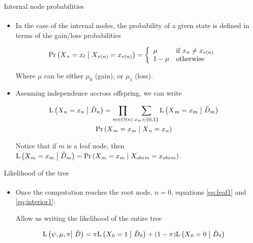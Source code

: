 \documentclass[9pt,ignorenonframetext,]{beamer}
\newcommand{\Prcond}[2]{{\mbox{Pr}\left(#1\vphantom{#2}\;\right|\left.\vphantom{#1}#2\right)}}
\newcommand{\Likecond}[2]{{\mbox{L}\left(#1\vphantom{#2}\;\right|\left.\vphantom{#1}#2\right)}}
\newcommand{\likelihood}[2]{\mbox{L}\left(#1\vphantom{#2}\right|\left.\vphantom{#1}#2\right)}
\newcommand{\aphylo}{D{}}      %
\newcommand{\aphyloObs}{\tilde \aphylo{}} %
\newcommand{\Ann}{X{}} %
\newcommand{\ann}{x{}} %
\newcommand{\AnnObs}{{X_{obs}}{}}%
\newcommand{\annObs}{{x_{obs}}{}}%
\begin{document}
\begin{frame}[t,label=internalnodeprob]{Internal node probabilities}

\framesubtitle{\hyperlink{peelingalgorithm}{}}

\begin{itemize}
\item
  In the case of the internal nodes, the probability of a given state is
  defined in terms of the gain/loss probabilities

  \[
  \Prcond{\Ann_{n} = \ann_{l}}{\Ann_{r(n)} = \ann_{r(n)}} = \left\{
  \begin{array}{ll}
  \mu & \mbox{if }\ann_{n} \neq \ann_{r(n)} \\
  1 - \mu & \mbox{otherwise}
  \end{array}
  \right.
  \]

  Where \(\mu\) can be either \(\mu_0\) (gain), or \(\mu_1\) (loss).
\item
  Assuming independence accross offspring, we can write

  \begin{multline}
  \label{eq:interior1}
  \Likecond{\Ann_n = \ann_n}{\aphyloObs_n} = %
  \prod_{m \in O(n)} \sum_{\ann_m \in \{0,1\}} \Likecond{\Ann_m = \ann_m}{\aphyloObs_m} \\
  \Prcond{\Ann_{m} = \ann_{m}}{\Ann_{n} = \ann_{n}}
  \end{multline}

  Notice that if \(m\) is a leaf node, then
  \(\Likecond{\Ann_m = \ann_m}{\aphyloObs_m} = \Prcond{\Ann_m = \ann_m}{\AnnObs_m = \annObs_m}\).
\end{itemize}

\end{frame}

\begin{frame}[t,label=likelihood]{Likelihood of the tree}

\framesubtitle{\hyperlink{peelingalgorithm}{}}

\begin{itemize}
\item
  Once the computation reaches the root node, \(n=0\), equations
  \eqref{eq:leaf1} and \eqref{eq:interior1}:

  Allow us writing the likelihood of the entire tree

  \begin{equation}
  \label{eq:l}
  \likelihood{\psi, \mu, \pi}{\aphyloObs} = \pi\Likecond{\Ann_0=1}{\aphyloObs_0} + (1 - \pi)\Likecond{\Ann_0=0}{\aphyloObs_0}
  \end{equation}
\end{itemize}

\end{frame}
\end{document}
